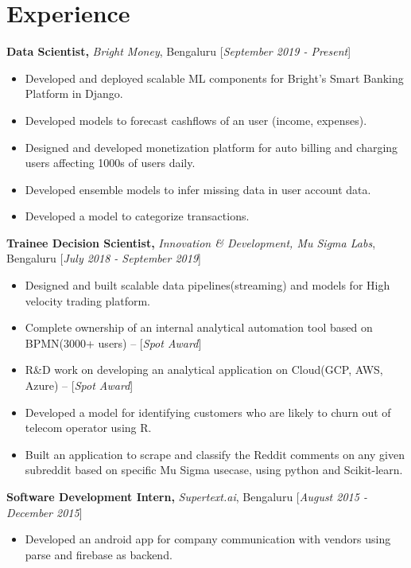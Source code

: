 \documentclass[10pt]{article}
\renewcommand{\textbf}[1]{{\bfseries\color{accent_darkest}#1}}
\begin{document}
\section*{Experience} 
\textbf{Data Scientist,} \textit{Bright Money},
 Bengaluru \hfill \textcolor{grey_darker}{[\textit{September 2019 - Present}]}
\begin{itemize}
    \itemsep0em
    \item Developed and deployed scalable ML components for Bright's Smart Banking Platform in Django.
    \item Developed models to forecast cashflows of an user (income, expenses).
    \item Designed and developed monetization platform for auto billing and charging users affecting 1000s of users daily.
    \item Developed ensemble models to infer missing data in user account data.
    \item Developed a model to categorize transactions.
\end{itemize}
\textbf{Trainee Decision Scientist,} \textit{Innovation \& Development, Mu Sigma Labs},
 Bengaluru \hfill \textcolor{grey_darker}{[\textit{July 2018 - September 2019}]}
\begin{itemize}
    \itemsep0em
    \item Designed and built scalable data pipelines(streaming) and models for High velocity trading platform.
    \item Complete ownership of an internal analytical automation tool based on BPMN(3000+ users)  -- [\textit{Spot Award}] 
    \item R\&D work on developing an analytical application on Cloud(GCP, AWS, Azure) -- [\textit{Spot Award}]
    \item Developed a model for identifying customers who are likely to churn out of telecom operator using R.
    \item Built an application to scrape and classify the Reddit comments on any given subreddit based on specific Mu Sigma usecase, using python and Scikit-learn.
\end{itemize}
\medskip
\textbf{Software Development Intern,} \textit{Supertext.ai}, Bengaluru
\hfill \textcolor{grey_darker}{[\textit{August 2015 - December 2015}]}
\begin{itemize}
    \item Developed an android app for company communication with vendors using
    parse and firebase as backend.     
\end{itemize}
\end{document}
